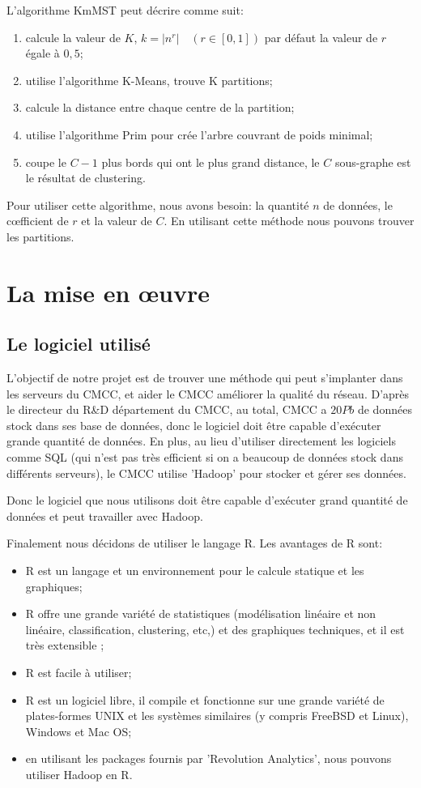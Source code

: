 L'algorithme KmMST peut décrire comme suit:


\begin{enumerate}
\item calcule la valeur de $K$, $k=\left\vert n^r \right\vert \quad  \left( r \in \left[ 0,1 \right]  \right) $ par défaut la valeur de $r$ égale à $0,5$;
\item utilise l'algorithme K-Means, trouve K partitions;
\item calcule la distance entre chaque centre de la partition;
\item utilise l'algorithme Prim pour crée l'arbre couvrant de poids minimal;
\item coupe le $C-1$ plus bords qui ont le plus grand distance, le $C$ sous-graphe est le résultat de clustering.
\end{enumerate}


Pour utiliser cette algorithme, nous avons besoin: la quantité $n$ de données, le c\oe fficient de $r$ et la valeur de $C$. En utilisant cette méthode nous pouvons trouver les partitions.

\section{La mise en \oe uvre}
\subsection{Le logiciel utilisé}
L'objectif de notre projet est de trouver une méthode qui peut s'implanter dans les serveurs du CMCC, et aider le CMCC améliorer la qualité du réseau. D'après le directeur du R\&D département du CMCC, au total, CMCC a $20Pb$ de données stock dans ses base de données, donc le logiciel doit être capable d'exécuter grande quantité de données. En plus,  au lieu d'utiliser directement les logiciels comme SQL (qui n'est pas très efficient si on a beaucoup de données stock dans différents serveurs), le CMCC utilise 'Hadoop' pour stocker et gérer ses données.

Donc le logiciel que nous utilisons doit être capable d'exécuter grand quantité de données et peut travailler avec Hadoop. 

Finalement nous décidons de utiliser le langage \textsf{R}. Les avantages de R sont:

\begin{itemize}
\item R est un langage et un environnement pour le calcule statique et les graphiques; 
\item R offre une grande variété de statistiques (modélisation linéaire et non linéaire, classification, clustering, etc,) et des graphiques techniques, et il est très extensible ;
\item R est facile à utiliser; 
\item R est un logiciel libre, il compile et fonctionne sur une grande variété de plates-formes UNIX et les systèmes similaires (y compris FreeBSD et Linux), Windows et Mac OS;
\item en utilisant les packages fournis par 'Revolution Analytics', nous pouvons utiliser Hadoop en R.
\end{itemize}

